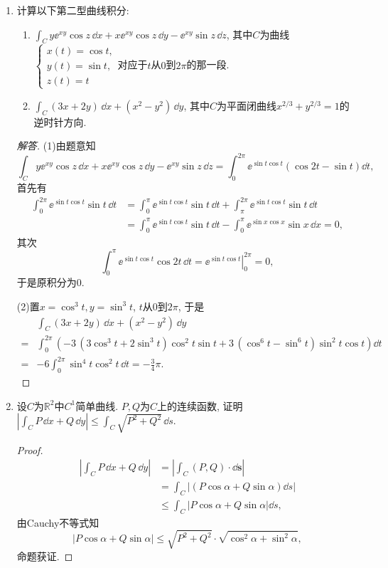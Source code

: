 \begin{quiza}
\begin{enumerate}
\item 计算以下第二型曲线积分:
\begin{enumerate}[label=(\arabic*)]
\item \(\int_{C}y\ee^{xy}\cos z\,\dd x+x\ee^{xy}\cos z\,\dd y-\ee^{xy}\sin z\,\dd z\), 
其中\(C\)为曲线\(\begin{cases}
x(t)=\cos t,\\y(t)=\sin t,\\z(t)=t
\end{cases}\)对应于\(t\)从\(0\)到\(2\pi\)的那一段.
\item \(\int_C (3x+2y)\,\dd x+(x^2-y^2)\,\dd y\), 
其中\(C\)为平面闭曲线\(x^{2/3}+y^{2/3}=1\)的逆时针方向.
\end{enumerate}
\begin{proof}[解答]
(1)由题意知
\[\int_{C}y\ee^{xy}\cos z\,\dd x+x\ee^{xy}\cos z\,\dd y-\ee^{xy}\sin z\,\dd z
=\int_{0}^{2\pi}\ee^{\sin t\cos t}\left(\cos 2t-\sin t\right)\dd t,\]
首先有
\[\begin{split}
\int_{0}^{2\pi}\ee^{\sin t\cos t}\sin t\,\dd t
&=\int_{0}^{\pi}\ee^{\sin t\cos t}\sin t\,\dd t
+\int_{\pi}^{2 \pi}\ee^{\sin t\cos t}\sin t\,\dd t\\
&=\int_{0}^{\pi}\ee^{\sin t\cos t}\sin t\,\dd t
-\int_{0}^{\pi}\ee^{\sin x\cos x}\sin x\,\dd x=0,\end{split}\]
其次\[\int_{0}^{\pi}\ee^{\sin t\cos t}\cos 2t\,\dd t
=\left.\ee^{\sin t\cos t}\right|^{2\pi}_0=0,\]于是原积分为\(0\).

(2)置\(x=\cos^3t,y=\sin^3t\), \(t\)从\(0\)到\(2\pi\), 于是
\[\begin{split}
&\int_C (3x+2y)\,\dd x+(x^2-y^2)\,\dd y\\
=&\int_{0}^{2\pi}\left(-3\,(3\cos^3t+2\sin^3t)\cos^2t\sin t+3\,(\cos^6t-\sin^6t)\sin^2t\cos t\right)\dd t\\
=&-6\int_{0}^{2\pi}\sin^4t\cos^2t\,\dd t=-\frac{3}{4}\pi.
\end{split}\]
\end{proof}

\item 设\(C\)为\(\mathbb{R}^2\)中\(C^1\)简单曲线. \(P,Q\)为\(C\)上的连续函数, 
证明\(\left|\int_C P\,\dd x+Q\,\dd y\right|\leqslant \int_C\sqrt{P^2+Q^2}\,\dd s\). 
\begin{proof}
\begin{align*}\left|\int_{C}P\,\dd x+Q\,\dd y\right|
&=\left|\int_C\left(P,Q\right)\cdot \dd \boldsymbol{s}\right|\\
&=\int_C\left|\left(P\cos\alpha+Q\sin\alpha\right)\dd s\right|\\
&\leqslant\int_C\left|P\cos\alpha+Q\sin\alpha\right|\dd s,\end{align*}
由Cauchy不等式知\[|P\cos\alpha+Q\sin\alpha|
\leqslant\sqrt{P^2+Q^2}\cdot\sqrt{\cos^2\alpha+\sin^2\alpha},\]
命题获证.
\end{proof}
\end{enumerate}
\end{quiza}

